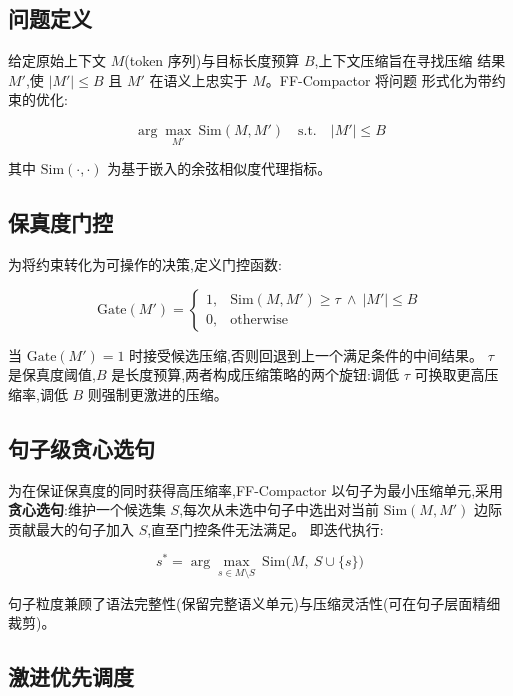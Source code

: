 \documentclass[11pt,a4paper]{article}
\begin{document}
\subsection{问题定义}

给定原始上下文 $M$(token 序列)与目标长度预算 $B$,上下文压缩旨在寻找压缩
结果 $M'$,使 $|M'| \le B$ 且 $M'$ 在语义上忠实于 $M$。FF-Compactor 将问题
形式化为带约束的优化:

\begin{equation}
  \arg\max_{M'} \ \mathrm{Sim}(M, M') \quad \text{s.t.} \quad |M'| \le B
\end{equation}

其中 $\mathrm{Sim}(\cdot, \cdot)$ 为基于嵌入的余弦相似度代理指标。

\subsection{保真度门控}

为将约束转化为可操作的决策,定义门控函数:

\begin{equation}
  \mathrm{Gate}(M') = \begin{cases}
    1, & \mathrm{Sim}(M, M') \ge \tau \ \wedge\ |M'| \le B \\
    0, & \text{otherwise}
  \end{cases}
\end{equation}

当 $\mathrm{Gate}(M')=1$ 时接受候选压缩,否则回退到上一个满足条件的中间结果。
$\tau$ 是保真度阈值,$B$ 是长度预算,两者构成压缩策略的两个旋钮:调低 $\tau$
可换取更高压缩率,调低 $B$ 则强制更激进的压缩。

\subsection{句子级贪心选句}

为在保证保真度的同时获得高压缩率,FF-Compactor 以句子为最小压缩单元,采用
\textbf{贪心选句}:维护一个候选集 $S$,每次从未选中句子中选出对当前
$\mathrm{Sim}(M, M')$ 边际贡献最大的句子加入 $S$,直至门控条件无法满足。
即迭代执行:

\begin{equation}
  s^* = \arg\max_{s \in M \setminus S} \ \mathrm{Sim}\big(M,\ S \cup \{s\}\big)
\end{equation}

句子粒度兼顾了语法完整性(保留完整语义单元)与压缩灵活性(可在句子层面精细裁剪)。

\subsection{激进优先调度}
\end{document}
